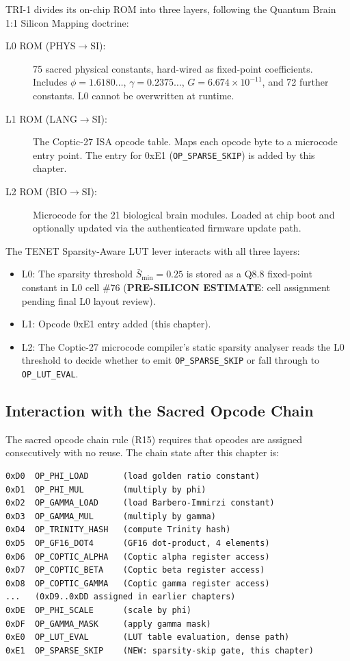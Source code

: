 TRI-1 divides its on-chip ROM into three layers, following the
Quantum Brain 1:1 Silicon Mapping doctrine:

\begin{description}
  \item[L0 ROM (PHYS$\to$SI):] 75 sacred physical constants,
        hard-wired as fixed-point coefficients.
        Includes $\phi = 1.6180\ldots$, $\gamma = 0.2375\ldots$,
        $G = 6.674 \times 10^{-11}$, and 72 further constants.
        L0 cannot be overwritten at runtime.

  \item[L1 ROM (LANG$\to$SI):] The Coptic-27 ISA opcode table.
        Maps each opcode byte to a microcode entry point.
        The entry for 0xE1 (\texttt{OP\_SPARSE\_SKIP}) is added
        by this chapter.

  \item[L2 ROM (BIO$\to$SI):] Microcode for the 21 biological brain
        modules.  Loaded at chip boot and optionally updated via
        the authenticated firmware update path.
\end{description}

The TENET Sparsity-Aware LUT lever interacts with all three layers:
\begin{itemize}
  \item L0: The sparsity threshold $\bar{S}_{\min} = 0.25$ is stored
        as a Q8.8 fixed-point constant in L0 cell \#76
        (\textbf{PRE-SILICON ESTIMATE}: cell assignment pending
        final L0 layout review).
  \item L1: Opcode 0xE1 entry added (this chapter).
  \item L2: The Coptic-27 microcode compiler's static sparsity analyser
        reads the L0 threshold to decide whether to emit
        \texttt{OP\_SPARSE\_SKIP} or fall through to \texttt{OP\_LUT\_EVAL}.
\end{itemize}

\subsection{Interaction with the Sacred Opcode Chain}
\label{subsec:ch79-opcode-chain-interaction}

The sacred opcode chain rule (R15) requires that opcodes are assigned
consecutively with no reuse.
The chain state after this chapter is:

\begin{verbatim}
0xD0  OP_PHI_LOAD       (load golden ratio constant)
0xD1  OP_PHI_MUL        (multiply by phi)
0xD2  OP_GAMMA_LOAD     (load Barbero-Immirzi constant)
0xD3  OP_GAMMA_MUL      (multiply by gamma)
0xD4  OP_TRINITY_HASH   (compute Trinity hash)
0xD5  OP_GF16_DOT4      (GF16 dot-product, 4 elements)
0xD6  OP_COPTIC_ALPHA   (Coptic alpha register access)
0xD7  OP_COPTIC_BETA    (Coptic beta register access)
0xD8  OP_COPTIC_GAMMA   (Coptic gamma register access)
...   (0xD9..0xDD assigned in earlier chapters)
0xDE  OP_PHI_SCALE      (scale by phi)
0xDF  OP_GAMMA_MASK     (apply gamma mask)
0xE0  OP_LUT_EVAL       (LUT table evaluation, dense path)
0xE1  OP_SPARSE_SKIP    (NEW: sparsity-skip gate, this chapter)
\end{verbatim}

